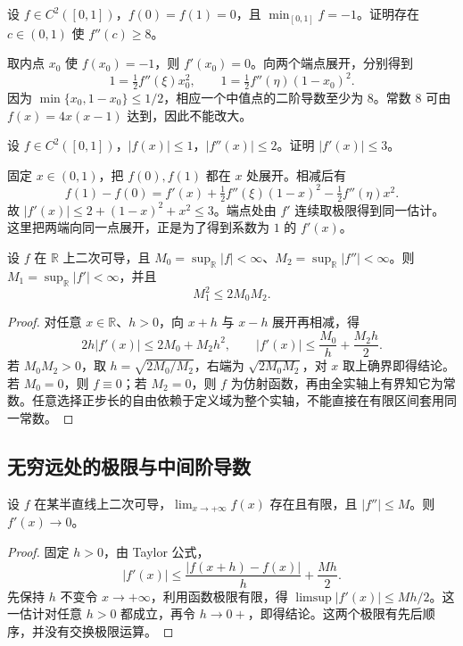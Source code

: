 \begin{example}
\label{ex:pei-diff-curvature-bound}
设 $f\in C^2([0,1])$，$f(0)=f(1)=0$，且 $\min_{[0,1]}f=-1$。证明存在 $c\in(0,1)$ 使 $f''(c)\ge8$。
\end{example}
\begin{solve}
取内点 $x_0$ 使 $f(x_0)=-1$，则 $f'(x_0)=0$。向两个端点展开，分别得到
\[
 1=\tfrac12f''(\xi)x_0^2,\qquad
 1=\tfrac12f''(\eta)(1-x_0)^2.
\]
因为 $\min\{x_0,1-x_0\}\le1/2$，相应一个中值点的二阶导数至少为 $8$。常数 $8$ 可由 $f(x)=4x(x-1)$ 达到，因此不能改大。
\end{solve}

\begin{example}
\label{ex:pei-diff-finite-interval-bound}
设 $f\in C^2([0,1])$，$|f(x)|\le1$，$|f''(x)|\le2$。证明 $|f'(x)|\le3$。
\end{example}
\begin{solve}
固定 $x\in(0,1)$，把 $f(0),f(1)$ 都在 $x$ 处展开。相减后有
\[
 f(1)-f(0)=f'(x)+\tfrac12f''(\xi)(1-x)^2
                         -\tfrac12f''(\eta)x^2.
\]
故 $|f'(x)|\le2+(1-x)^2+x^2\le3$。端点处由 $f'$ 连续取极限得到同一估计。这里把两端向同一点展开，正是为了得到系数为 $1$ 的 $f'(x)$。
\end{solve}

\begin{proposition}[全实轴上的导数界]
\label{prop:pei-diff-landau-bound}
设 $f$ 在 $\mathbb R$ 上二次可导，且
$M_0=\sup_{\mathbb R}|f|<\infty$、$M_2=\sup_{\mathbb R}|f''|<\infty$。则 $M_1=\sup_{\mathbb R}|f'|<\infty$，并且
\begin{equation}
 M_1^2\le2M_0M_2.
 \label{eq:pei-diff-landau-bound}
\end{equation}
\end{proposition}
\begin{proof}
对任意 $x\in\mathbb R$、$h>0$，向 $x+h$ 与 $x-h$ 展开再相减，得
\[
 2h|f'(x)|\le2M_0+M_2h^2,
 \qquad |f'(x)|\le\frac{M_0}{h}+\frac{M_2h}{2}.
\]
若 $M_0M_2>0$，取 $h=\sqrt{2M_0/M_2}$，右端为 $\sqrt{2M_0M_2}$，对 $x$ 取上确界即得结论。若 $M_0=0$，则 $f\equiv0$；若 $M_2=0$，则 $f$ 为仿射函数，再由全实轴上有界知它为常数。任意选择正步长的自由依赖于定义域为整个实轴，不能直接在有限区间套用同一常数。
\end{proof}

\subsection{无穷远处的极限与中间阶导数}

\begin{proposition}
\label{prop:pei-diff-limit-bounded-second}
设 $f$ 在某半直线上二次可导，$\lim_{x\to+\infty}f(x)$ 存在且有限，且 $|f''|\le M$。则 $f'(x)\to0$。
\end{proposition}
\begin{proof}
固定 $h>0$，由 Taylor 公式，
\[
 |f'(x)|\le\frac{|f(x+h)-f(x)|}{h}+\frac{Mh}{2}.
\]
先保持 $h$ 不变令 $x\to+\infty$，利用函数极限有限，得 $\limsup|f'(x)|\le Mh/2$。这一估计对任意 $h>0$ 都成立，再令 $h\to0+$，即得结论。这两个极限有先后顺序，并没有交换极限运算。
\end{proof}

